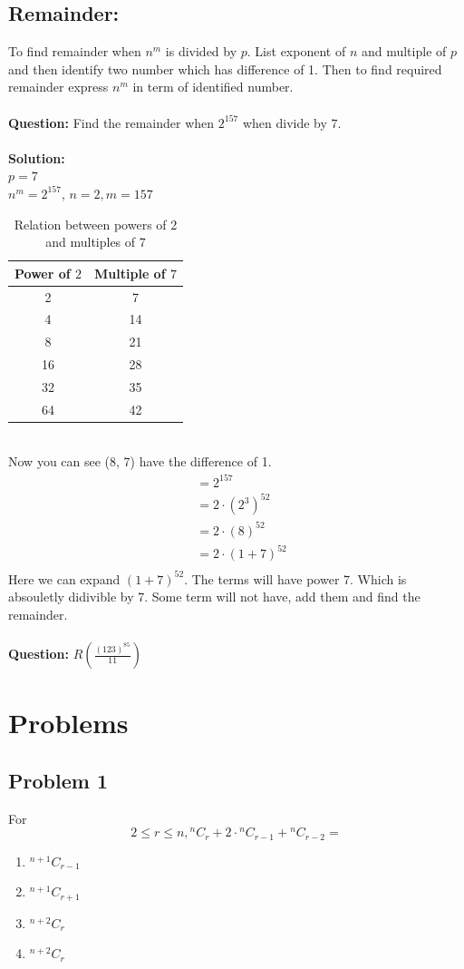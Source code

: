 \documentclass[12pt]{article}
\begin{document}
\subsection{Remainder: }
To find remainder when $n^m$ is divided by $p$. List exponent of $n$ and multiple of $p$ and then identify two number which has difference of 1. Then to find required remainder express $n^m$ in term of identified number.\\
\\
\textbf{Question: } Find the remainder when $2^{157}$ when divide by $7$. \\
\\
\textbf{Solution: }\\
$p = 7$ \\
$n^m = 2^{157}$, $n = 2, m = 157$\\
\begin{table}[h]
\centering
\begin{tabular}{|c|c|}
\hline
Power of $2$ & Multiple of $7$ \\
\hline
2  & 7  \\
4  & 14 \\
8  & 21 \\
16 & 28 \\
32 & 35 \\
64 & 42 \\
\hline
\end{tabular}
\caption{Relation between powers of 2 and multiples of 7}
\end{table}
\\
Now you can see (8, 7) have the difference of 1. \\
\[
\begin{aligned}
    &= 2^{157} \\
    &= 2 \cdot (2^3)^52 \\
    &= 2 \cdot(8)^52 \\
    &= 2 \cdot (1+7)^52 \\
\end{aligned}
\]
Here we can expand $(1+7)^{52}$. The terms will have power 7. Which is absouletly didivible by 7. Some term will not have, add them and find the remainder.\\
\\
\textbf{Question: } $R\left( \frac{(123)^{85}}{11}\right)$
\newpage
\section{Problems}
\subsection*{Problem 1}
For \[
2 \leq r \leq n, {}^{n}C_{r}+ 2\cdot {}^{n}C_{r-1}+{}^{n}C_{r-2}=
\]
\begin{enumerate}[label = (\Alph*)]
    \item ${}^{n+1}C_{r-1}$
    \item ${}^{n+1}C_{r+1}$
    \item ${}^{n+2}C_{r}$
    \item ${}^{n+2}C_{r}$
\end{enumerate}
\end{document}
